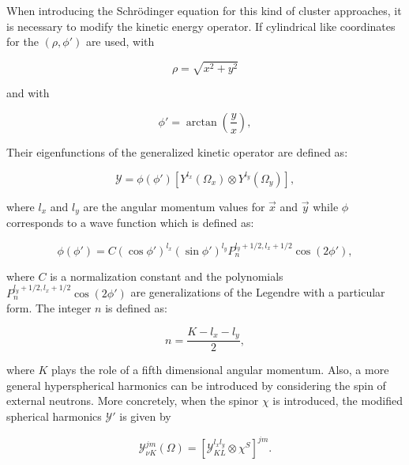 \documentclass[openany]{book}
\begin{document}
When introducing the Schrödinger equation for this kind of cluster approaches, it is necessary to modify the kinetic energy operator. If cylindrical like coordinates for the  $(\rho, \phi')$ are used, with 

\begin{equation}\label{eq:micro_cluster_breakup_rho}
	\rho = \sqrt{x^2 + y^2}
\end{equation}

and with 

\begin{equation}\label{eq:micro_cluster_breakup_phi}
	\phi' = \arctan \left( \frac{y}{x}\right),
\end{equation}


Their eigenfunctions of the generalized kinetic operator are defined as: 

\begin{equation}\label{eq:micro_cluster_breakup_hyperspherical}
	\mathcal{Y} = \phi (\phi') [Y^{l_x}(\Omega_x) \otimes Y^{l_y} (\Omega_y)],
\end{equation}

where $l_x$ and $l_y$ are the angular momentum values for $\vec x$ and $\vec y$ while $\phi$ corresponds to a wave function which is defined as: 

\begin{equation}\label{eq:micro_cluster_breakup_wavefunction}
	\phi(\phi')  = C (\cos \phi')^{l_x}   (\sin \phi')^{l_y} P_n^{l_y + 1/2, l_x + 1/2} \cos (2\phi'),
\end{equation}

where $C$ is a normalization constant and the polynomials $P_n^{l_y + 1/2, l_x + 1/2} \cos (2\phi')$ are generalizations of the Legendre with a particular form. The integer $n$ is defined as: 

\begin{equation}\label{eq:micro_cluster_breakup_n}
	n = \frac{K - l_x - l_y}{2},
\end{equation}

where $K$ plays the role of a fifth dimensional angular momentum. Also, a more general hyperspherical harmonics can be introduced by considering the spin of external neutrons. More concretely, when the spinor $\chi$ is introduced, the modified spherical harmonics $\mathcal{Y}'$ is given by 

\begin{equation}\label{eq:micro_cluster_breakup_hyperspherical_spinor}
	\mathcal{Y}^{jm}_{\nu K}(\Omega) = [\mathcal{Y}^{l_xl_y}_{KL} \otimes \chi^{S}]^{jm}.
\end{equation}
\end{document}
